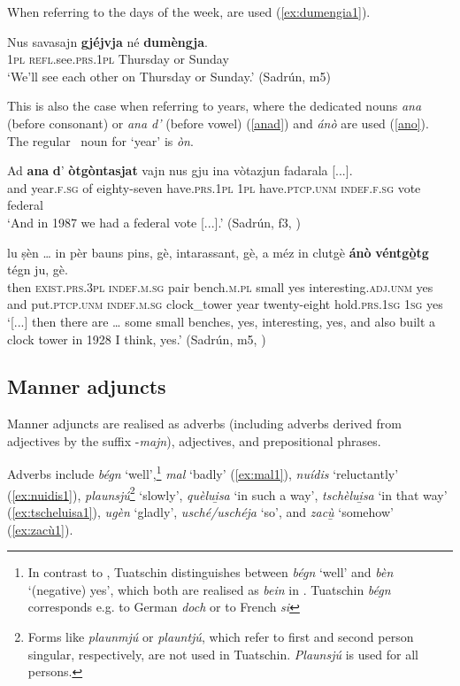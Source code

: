 When referring to the days of the week,  are used (\ref{ex:dumengia1}).

\ea
\label{ex:dumengia1}
\gll Nus savasajn \textbf{gjéjvja} né \textbf{dumèngja}.\\
\textsc{1pl} \textsc{refl}.see.\textsc{prs.1pl} Thursday or Sunday\\
\glt `We'll see each other on Thursday or Sunday.' (Sadrún, m5)
\z

This is also the case when referring to years, where the dedicated nouns \textit{ana} (before consonant) or \textit{ana d'} (before vowel) (\ref{anad}) and \textit{ánò} are used (\ref{ano}). The regular \
noun for `year' is \textit{òn}.

\ea
\label{anad}
\gll Ad \textbf{ana} \textbf{d}' \textbf{òtgòntasjat} vajn nus gju ina vòtazjun fadarala [...].   \\
and year.\textsc{f.sg} of eighty-seven have.\textsc{prs.1pl} \textsc{1pl} have.\textsc{ptcp.unm} \textsc{indef.f.sg} vote federal\\
\glt `And in 1987 we had a federal vote [...].' (Sadrún, f3, \sectref{sec:8.1})
\z

\ea
\label{ano}
\gll  [...] lu ṣèn … in pèr bauns pins, gè, intarassant, gè, a méz in clutgè \textbf{ánò} \textbf{véntgò̱tg} tégn ju, gè.\\
{} then \textsc{exist.prs.3pl} {} \textsc{indef.m.sg} pair bench.\textsc{m.pl} small yes interesting.\textsc{adj.unm} yes and put.\textsc{ptcp.unm} \textsc{indef.m.sg} clock\_tower year twenty-eight hold.\textsc{prs.1sg} \textsc{1sg} yes \\
\glt `[...] then there are … some small benches, yes, interesting, yes, and also built a clock tower in 1928 I think, yes.' (Sadrún, m5, \sectref{sec:8.8})
\z

\subsection{Manner adjuncts}\label{sec:4.3.3}
Manner adjuncts are realised as adverbs (including adverbs derived from adjectives by the suffix -\textit{majn}), adjectives, and prepositional phrases.

Adverbs include \textit{bégn} `well',\footnote{In contrast to , Tuatschin distinguishes between \textit{bégn} `well' and \textit{bèn} `(negative) yes', which both are realised as \textit{bein} in . Tuatschin \textit{bégn} corresponds e.g. to  German \textit{doch} or to  French \textit{si}} \textit{mal} `badly' (\ref{ex:mal1}), \textit{nuídis} `reluctantly' (\ref{ex:nuidis1}), \textit{plaunsjú}\footnote{Forms like \textit{plaunmjú} or \textit{plauntjú}, which refer to first and second person singular, respectively, are not used in Tuatschin. \textit{Plaunsjú} is used for all persons.} `slowly', \textit{quèlui̱sa} `in such a way', \textit{tschèlui̱sa} `in that way' (\ref{ex:tscheluisa1}), \textit{ugèn} `gladly', \textit{usché/uschéja} `so', and \textit{zacù̱} `somehow' (\ref{ex:zacù1}).

